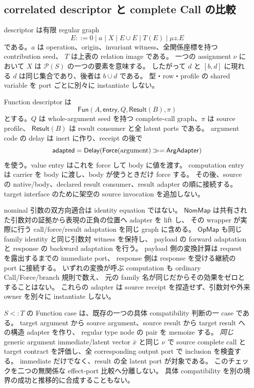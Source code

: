 \documentclass[11pt,a4paper]{article}
\theoremstyle{remark}
\begin{document}
\subsection{correlated descriptor と complete Call の比較}

descriptor は有限 regular graph
\[
 E::=0\mid a\mid X\mid E\cup E\mid T(E)\mid\mu z.E
\]
である。$a$ は operation、origin、invariant witness、全関係座標を持つ contribution seed、
$T$ は上表の relation image である。
一つの assignment $\nu$ において $X$ は $\mathcal P(S)$ の一つの要素を意味する。
したがって $d$ と $[b,d]$ に現れる $d$ は同じ集合であり、後者は $b\cup d$ である。
型・row・profile の shared variable を port ごとに別々に instantiate しない。

Function descriptor は
\[
 \mathsf{Fun}(A,\mathsf{entry},Q,\mathsf{Result}(B),\pi)
\]
とする。$Q$ は whole-argument seed を持つ complete-call graph、$\pi$ は source profile、
$\mathsf{Result}(B)$ は result consumer と全 latent ports である。
argument code の delay は inert に作り、receipt の後で
\[
 \mathsf{adapted}=\mathsf{Delay}
        (\mathsf{Force}({\rm argument})\mathbin{\gg=}\mathsf{ArgAdapter})
\]
を使う。value entry はこれを force して body に値を渡す。
computation entry は carrier を body に渡し、body が使うときだけ force する。
その後、source の native/body、declared result consumer、result adapter の順に接続する。
target interface のために架空の source invocation を追加しない。

nominal 引数の双方向適合は identity equation ではない。
\(\mathsf{NomMap}\) は共有された引数対の証拠から表現の正負の位置へ adapter を lift し、
その wrapper が実際に行う call/force/result adaptation を同じ graph に含める。
\(\mathsf{OpMap}\) も同じ family identity と同じ引数対 witness を保持し、
payload の forward adaptation と response の backward adaptation を行う。
payload 側の変換計算は request を露出するまでの immediate port、
response 側は response を受ける継続の port に接続する。
いずれの変換が呼ぶ computation も ordinary Call/Force/branch 規則で数え、
元の family 名が同じだからその効果をゼロとすることはない。
これらの adapter は source receipt を捏造せず、引数対や外来 owner を別々に instantiate しない。

$S<:T$ の Function case は、既存の一つの具体 compatibility 判断の一 case である。
target argument から source argument、source result から target result への構造 adapter を作り、
regular type node の pair を memoize する。
\emph{同じ} generic argument immediate/latent vector $\bar x$ と同じ $\nu$ で
source complete call と target contract を評価し、全 corresponding output port で inclusion を検査する。
immediate だけでなく、result の全 latent port が対象である。
このチェックを二つの無関係な effect-port 比較へ分離しない。
具体 compatibility を別の境界の成功と推移的に合成することもない。
\end{document}
